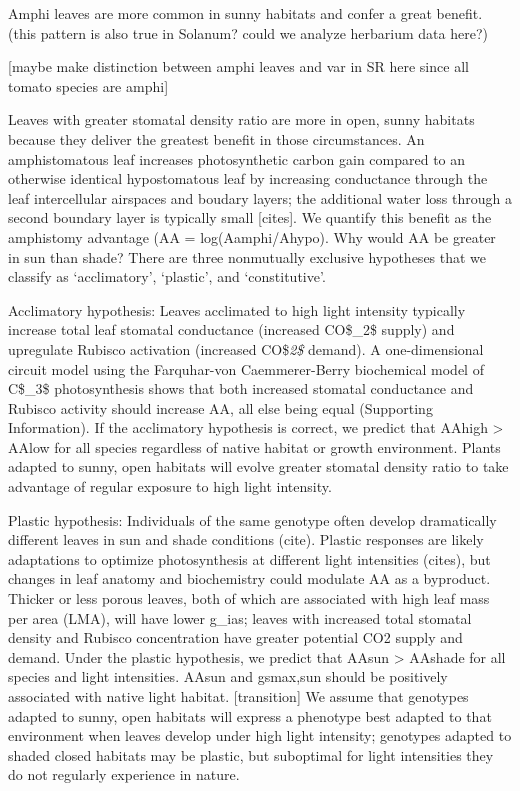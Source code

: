 \documentclass[
  letterpaper,
  DIV=11,
  numbers=noendperiod]{scrartcl}
\begin{document}
Amphi leaves are more common in sunny habitats and confer a great
benefit. (this pattern is also true in Solanum? could we analyze
herbarium data here?)

{[}maybe make distinction between amphi leaves and var in SR here since
all tomato species are amphi{]}

Leaves with greater stomatal density ratio are more in open, sunny
habitats because they deliver the greatest benefit in those
circumstances. An amphistomatous leaf increases photosynthetic carbon
gain compared to an otherwise identical hypostomatous leaf by increasing
conductance through the leaf intercellular airspaces and boudary layers;
the additional water loss through a second boundary layer is typically
small {[}cites{]}. We quantify this benefit as the amphistomy advantage
(AA = log(Aamphi/Ahypo). Why would AA be greater in sun than shade?
There are three nonmutually exclusive hypotheses that we classify as
`acclimatory', `plastic', and `constitutive'.

Acclimatory hypothesis: Leaves acclimated to high light intensity
typically increase total leaf stomatal conductance (increased CO\$\_2\$
supply) and upregulate Rubisco activation (increased CO\$\emph{2\$}
demand). A one-dimensional circuit model using the Farquhar-von
Caemmerer-Berry biochemical model of C\$\_3\$ photosynthesis shows that
both increased stomatal conductance and Rubisco activity should increase
AA, all else being equal (Supporting Information). If the acclimatory
hypothesis is correct, we predict that AAhigh \textgreater{} AAlow for
all species regardless of native habitat or growth environment. Plants
adapted to sunny, open habitats will evolve greater stomatal density
ratio to take advantage of regular exposure to high light intensity.

Plastic hypothesis: Individuals of the same genotype often develop
dramatically different leaves in sun and shade conditions (cite).
Plastic responses are likely adaptations to optimize photosynthesis at
different light intensities (cites), but changes in leaf anatomy and
biochemistry could modulate AA as a byproduct. Thicker or less porous
leaves, both of which are associated with high leaf mass per area (LMA),
will have lower g\_ias; leaves with increased total stomatal density and
Rubisco concentration have greater potential CO2 supply and demand.
Under the plastic hypothesis, we predict that AAsun \textgreater{}
AAshade for all species and light intensities. AAsun and gsmax,sun
should be positively associated with native light habitat.
{[}transition{]} We assume that genotypes adapted to sunny, open
habitats will express a phenotype best adapted to that environment when
leaves develop under high light intensity; genotypes adapted to shaded
closed habitats may be plastic, but suboptimal for light intensities
they do not regularly experience in nature.
\end{document}
